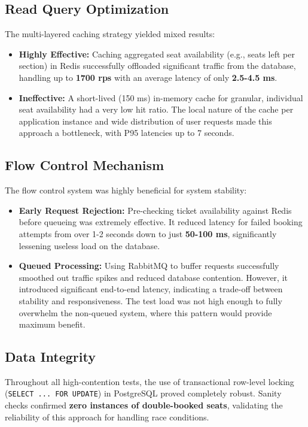 \documentclass[a0,landscape]{config/poster/a0poster}
\begin{document}
\begin{multicols}{4}
    \subsection*{Read Query Optimization}
    The multi-layered caching strategy yielded mixed results:
    \begin{itemize}
        \item \textbf{Highly Effective:} Caching aggregated seat availability (e.g., seats left per section) in Redis successfully offloaded significant traffic from the database, handling up to \textbf{1700 rps} with an average latency of only \textbf{2.5-4.5 ms}.
        \item \textbf{Ineffective:} A short-lived (150 ms) in-memory cache for granular, individual seat availability had a very low hit ratio. The local nature of the cache per application instance and wide distribution of user requests made this approach a bottleneck, with P95 latencies up to 7 seconds.
    \end{itemize}

    \subsection*{Flow Control Mechanism}
    The flow control system was highly beneficial for system stability:
    \begin{itemize}
        \item \textbf{Early Request Rejection:} Pre-checking ticket availability against Redis before queueing was extremely effective. It reduced latency for failed booking attempts from over 1-2 seconds down to just \textbf{50-100 ms}, significantly lessening useless load on the database.
        \item \textbf{Queued Processing:} Using RabbitMQ to buffer requests successfully smoothed out traffic spikes and reduced database contention. However, it introduced significant end-to-end latency, indicating a trade-off between stability and responsiveness. The test load was not high enough to fully overwhelm the non-queued system, where this pattern would provide maximum benefit.
    \end{itemize}

    \subsection*{Data Integrity}
    Throughout all high-contention tests, the use of transactional row-level locking (\texttt{SELECT ... FOR UPDATE}) in PostgreSQL proved completely robust. Sanity checks confirmed \textbf{zero instances of double-booked seats}, validating the reliability of this approach for handling race conditions.


\end{multicols}
\end{document}
